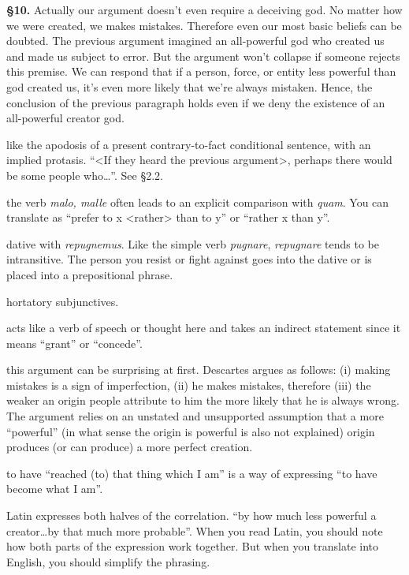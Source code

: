 \prenotes

\textbf{§10.} Actually our argument doesn't even require a deceiving god. No matter how we were created, we makes mistakes. Therefore even our most basic beliefs can be doubted. The previous argument imagined an all-powerful god who created us and made us subject to error. But the argument won't collapse if someone rejects this premise. We can respond that if a person, force, or entity less powerful than god created us, it's even more likely that we're always mistaken. Hence, the conclusion of the previous paragraph holds even if we deny the existence of an all-powerful creator god.

 like the apodosis of a present contrary-to-fact conditional sentence, with an implied protasis. ``<If they heard the previous argument>, perhaps there would be some people who\dots''. See §2.2.

 the verb \textit{malo, malle} often leads to an explicit comparison with \textit{quam}. You can translate as ``prefer to x <rather> than to y'' or ``rather x than y''.

 dative with \textit{repugnemus}. Like the simple verb \textit{pugnare}, \textit{repugnare} tends to be intransitive. The person you resist or fight against goes into the dative or is placed into a prepositional phrase.

 hortatory subjunctives.

 acts like a verb of speech or thought here and takes an indirect statement since it means ``grant'' or ``concede''.

 this argument can be surprising at first. Descartes argues as follows: (i) making mistakes is a sign of imperfection, (ii) he makes mistakes, therefore (iii) the weaker an origin people attribute to him the more likely that he is always wrong. The argument relies on an unstated and unsupported assumption that a more ``powerful'' (in what sense the origin is powerful is also not explained) origin produces (or can produce) a more perfect creation.

 to have ``reached (to) that thing which I am'' is a way of expressing ``to have become what I am''.

 Latin expresses both halves of the correlation. ``by how much less powerful a creator\dots by that much more probable''. When you read Latin, you should note how both parts of the expression work together. But when you translate into English, you should simplify the phrasing.

